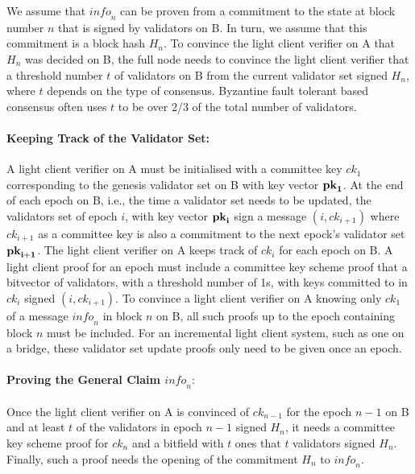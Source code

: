 We assume that $\mathit{info}_n$ can be proven from a commitment to the state at block number $n$ that is signed by validators on B. 
In turn, we assume that this commitment is a block hash $H_n$. To convince the light client verifier on A that $H_n$ was decided on B, 
the full node needs to convince the light client verifier that a threshold number $t$ of validators on B from the current validator set 
signed $H_n$, where $t$ depends on the type of consensus. Byzantine fault tolerant based consensus often uses $t$ to be 
over 2/3 of the total number of validators.

\noindent\paragraph{Keeping Track of the Validator Set:} A light client verifier on A must be initialised with a committee key $\mathit{ck}_1$ 
corresponding to the genesis validator set on B with key vector $\bf{pk}_1$. At the end of each epoch on B, i.e., the time a validator set needs 
to be updated, the validators set of epoch $i$, with key vector $\bf{pk}_i$ sign a message $(i,\mathit{ck}_{i+1})$ where $\mathit{ck}_{i+1}$ as 
a committee key is also a commitment to the next epock's validator set $\bf{pk}_{i+1}$. The light client verifier on A 
keeps track of $\mathit{ck}_i$ for each epoch on B. A light client proof for an epoch must include a committee key scheme proof 
that a bitvector of validators, with a threshold number of 1s, with keys committed to in $\mathit{ck}_i$ signed $(i,\mathit{ck}_{i+1})$. 
To convince a light client verifier on A knowing only $\mathit{ck}_1$ of a message $\mathit{info}_n$ in block $n$ on B, 
all such proofs up to the epoch containing block $n$ must be included. For an incremental light client system, such as one on a 
bridge, these validator set update proofs only need to be given once an epoch.
\vspace{-0.05in}

\noindent\paragraph{Proving the General Claim $\mathit{info}_n:$} Once the light client verifier on A is convinced of $\mathit{ck}_{n-1}$ 
for the epoch $n-1$ on B and at least $t$ of the validators in epoch $n-1$ signed $H_n$, it needs a committee key scheme proof for 
$\mathit{ck}_n$ and a bitfield with $t$ ones that $t$ validators signed $H_n$. Finally, such a proof needs the opening of the 
commitment $H_n$ to $\mathit{info}_n$.
\vspace{-0.08in}

